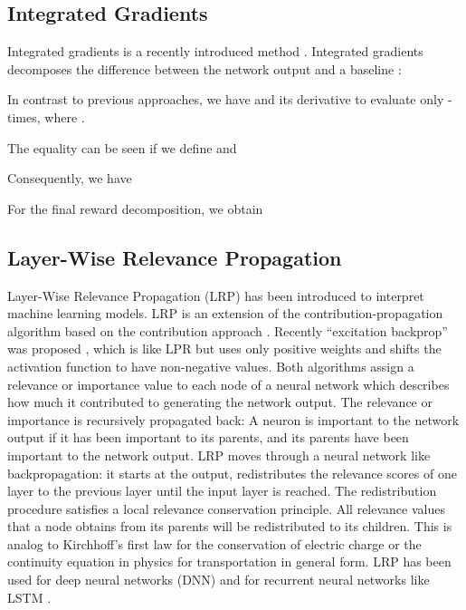 \documentclass{article}
\begin{document}
\begin{appendices}
\subsection{Integrated Gradients}

Integrated gradients is a recently introduced method
\cite{Sundararajan:17}.
Integrated gradients decomposes the difference 
between the network output  and a baseline :

In contrast to previous approaches, we have  and its derivative to
evaluate only -times, where .
 

The equality can be seen if we define  and

Consequently, we have


For the final reward decomposition, we obtain



\subsection{Layer-Wise Relevance Propagation}
\label{sec:ALRP}

Layer-Wise Relevance Propagation (LRP) \cite{Bach:15}
has been introduced to interpret machine learning models.
LRP is an extension of
the contribution-propagation algorithm \cite{Landecker:13} based on
the contribution approach \cite{Poulin:06}.
Recently ``excitation backprop'' was proposed \cite{Zhang:16},
which is like LPR but uses only positive weights and shifts the
activation function to have non-negative values.
Both algorithms assign a relevance or importance value
to each node of a neural network which describes how much
it contributed to generating the network output.
The relevance or importance is recursively propagated back:
A neuron is important to the network output if it has been important to its
parents, and its parents have been important to the network output.
LRP moves through a neural network like backpropagation:
it starts at the output, redistributes the relevance scores of one
layer to the previous layer until the input layer is reached.
The redistribution procedure satisfies a local relevance
conservation principle. All relevance values that a node obtains from its parents will be
redistributed to its children.
This is analog to Kirchhoff's first law for the conservation of electric charge
or the continuity equation in physics for transportation in general form.
LRP has been used for deep neural networks (DNN) \cite{Montavon:17} and
for recurrent neural networks like LSTM \cite{Arras:17}.


\end{appendices}
\end{document}
